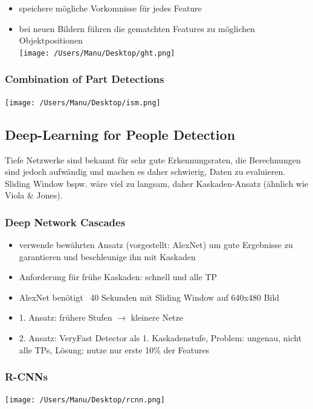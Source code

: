 \documentclass[paper=a4, fontsize=11pt]{scrartcl} %
\numberwithin{equation}{section} %
\numberwithin{figure}{section} %
\numberwithin{table}{section} %
\begin{document}
\begin{itemize}
\item speichere mögliche Vorkomnisse für jedes Feature
\item bei neuen Bildern führen die gematchten Features zu möglichen Objektpositionen\\ 
\texttt{[image: /Users/Manu/Desktop/ght.png]}
\end{itemize}

\subsubsection{Combination of Part Detections}

\texttt{[image: /Users/Manu/Desktop/ism.png]}

\subsection{Deep-Learning for People Detection}

Tiefe Netzwerke sind bekannt für sehr gute Erkennungsraten, die Berechnungen sind jedoch aufwändig und machen es daher schwierig, Daten zu evaluieren. Sliding Window bspw. wäre viel zu langsam, daher Kaskaden-Ansatz (ähnlich wie Viola \& Jones).

\subsubsection{Deep Network Cascades}

\begin{itemize}
\item verwende bewährten Ansatz (vorgestellt: AlexNet) um gute Ergebnisse zu garantieren und beschleunige ihn mit Kaskaden
\item Anforderung für frühe Kaskaden: schnell und alle TP
\item AlexNet benötigt ~40 Sekunden mit Sliding Window auf 640x480 Bild
\item 1. Ansatz: frühere Stufen $\rightarrow$ kleinere Netze
\item 2. Ansatz: VeryFast Detector als 1. Kaskadenstufe, Problem: ungenau, nicht alle TPs, Lösung: nutze nur erste 10\% der Features
\end{itemize}

\subsubsection{R-CNNs}

\texttt{[image: /Users/Manu/Desktop/rcnn.png]}
\end{document}

